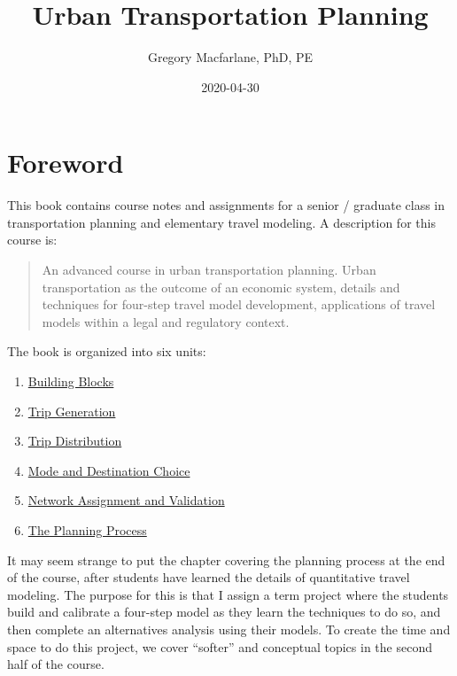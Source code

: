 \documentclass[]{book}
\title{Urban Transportation Planning}
\author{Gregory Macfarlane, PhD, PE}
\date{2020-04-30}
\providecommand{\tightlist}{%
  \setlength{\itemsep}{0pt}\setlength{\parskip}{0pt}}
\begin{document}
\maketitle

{
\setcounter{tocdepth}{1}
\tableofcontents
}
\hypertarget{syllabus}{%
\chapter*{Foreword}\label{syllabus}}

This book contains course notes and assignments for a senior / graduate class in
transportation planning and elementary travel modeling. A description for this course
is:

\begin{quote}
An advanced course in urban transportation planning. Urban transportation as
the outcome of an economic system, details and techniques for four-step travel
model development, applications of travel models within a legal and regulatory
context.
\end{quote}

The book is organized into six units:

\begin{enumerate}
\def\labelenumi{\arabic{enumi}.}
\tightlist
\item
  \protect\hyperlink{chap-blocks}{Building Blocks}
\item
  \protect\hyperlink{chap-tripgen}{Trip Generation}
\item
  \protect\hyperlink{chap-distribution}{Trip Distribution}
\item
  \protect\hyperlink{chap-modechoice}{Mode and Destination Choice}
\item
  \protect\hyperlink{chap-assignment}{Network Assignment and Validation}
\item
  \protect\hyperlink{chap-process}{The Planning Process}
\end{enumerate}

It may seem strange to put the chapter covering the planning process at the end
of the course, after students have learned the details of quantitative travel
modeling. The purpose for this is that I assign a term project where the
students build and calibrate a four-step model as they learn the techniques to do
so, and then complete an alternatives analysis using their models. To create
the time and space to do this project, we cover ``softer'' and conceptual topics
in the second half of the course.
\end{document}
